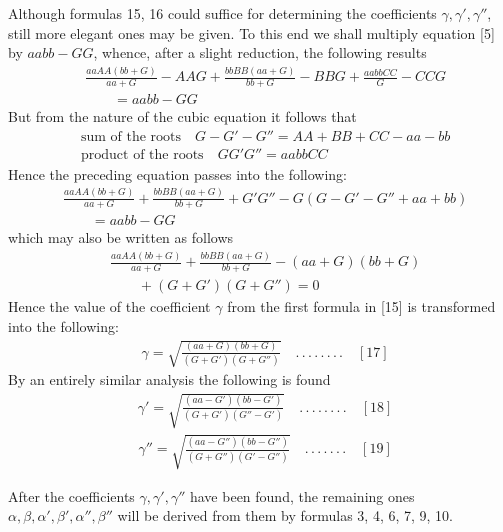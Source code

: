 \begingroup
\renewcommand{\arraystretch}{1.45}
Although formulas 15, 16 could suffice for determining the coefficients $\gamma,\gamma',\gamma''$, still more elegant ones may be given. To this end we shall multiply equation [5] by $aabb-GG$, whence, after a slight reduction, the following results
\[
\begin{aligned}
&\frac{aaAA(bb+G)}{aa+G}-AAG+\frac{bbBB(aa+G)}{bb+G}-BBG+\frac{aabbCC}{G}-CCG\\[6pt]
&\qquad{}=aabb-GG
\end{aligned}
\]
But from the nature of the cubic equation it follows that
\[
\begin{aligned}
&\text{sum of the roots}\quad G-G'-G''=AA+BB+CC-aa-bb\\[8pt]
&\text{product of the roots}\quad GG'G''=aabbCC
\end{aligned}
\]
Hence the preceding equation passes into the following:
\[
\begin{aligned}
&\frac{aaAA(bb+G)}{aa+G}+\frac{bbBB(aa+G)}{bb+G}+G'G''-G(G-G'-G''+aa+bb)\\[6pt]
&\qquad{}=aabb-GG
\end{aligned}
\]
which may also be written as follows
\[
\begin{aligned}
&\frac{aaAA(bb+G)}{aa+G}+\frac{bbBB(aa+G)}{bb+G}-(aa+G)(bb+G)\\[6pt]
&\qquad{}+(G+G')(G+G'')=0
\end{aligned}
\]
Hence the value of the coefficient $\gamma$ from the first formula in [15] is transformed into the following:
\[
\begin{aligned}
&\gamma=\surd{\frac{(aa+G)(bb+G)}{(G+G')(G+G'')}}\quad.\,.\,.\,.\,.\,.\,.\,.\quad[17]
\end{aligned}
\]
By an entirely similar analysis the following is found
\[
\begin{aligned}
&\gamma'=\surd{\frac{(aa-G')(bb-G')}{(G+G')(G''-G')}}\quad.\,.\,.\,.\,.\,.\,.\,.\quad[18]
\end{aligned}
\]
\[
\begin{aligned}
&\gamma''=\surd{\frac{(aa-G'')(bb-G'')}{(G+G'')(G'-G'')}}\quad.\,.\,.\,.\,.\,.\,.\quad[19]
\end{aligned}
\]
\par After the coefficients $\gamma,\gamma',\gamma''$ have been found, the remaining ones $\alpha,\beta,\alpha',\beta',\alpha'',\beta''$ will be derived from them by formulas 3, 4, 6, 7, 9,\nobreak{} 10.

